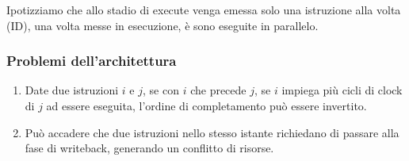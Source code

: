\documentclass[../template]{subfiles}
\begin{document}
Ipotizziamo che allo stadio di execute venga emessa solo una istruzione alla volta (ID), una volta messe in esecuzione,
è sono eseguite in parallelo.

\subsubsection{Problemi dell'architettura}
\begin{enumerate}
    \item Date due istruzioni $i$ e $j$, se con $i$ che precede $j$, se $i$ impiega più cicli di clock di $j$ ad essere eseguita,
        l'ordine di completamento può essere invertito.
    \item Può accadere che due istruzioni nello stesso istante richiedano di passare alla fase di writeback, generando
        un conflitto di risorse.
\end{enumerate}
\end{document}
